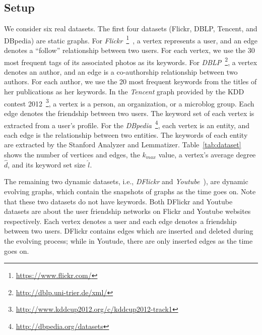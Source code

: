 \subsection{Setup}
\label{setup}

We consider six real datasets. The first four datasets (Flickr, DBLP, Tencent, and DBpedia) are static graphs.
For {\it Flickr}~\footnote{\url{https://www.flickr.com/}}~\cite{thomee2015new}, a vertex represents a user, and an edge denotes a ``follow'' relationship between two users. For each vertex, we use the 30 most frequent tags of its associated photos as its keywords.
For {\it DBLP}~\footnote{\url{http://dblp.uni-trier.de/xml/}}, a vertex denotes an author, and an edge is a co-authorship relationship between two authors.
For each author, we use the 20 most frequent keywords from the titles of her publications as her keywords.
In the {\it Tencent} graph provided by the KDD contest 2012~\footnote{\url{http://www.kddcup2012.org/c/kddcup2012-track1}}, a vertex is a person, an organization, or a microblog group. Each edge denotes the friendship between two users. The keyword set of each vertex is extracted from a user's profile. For the {\it DBpedia}~\footnote{\url{http://dbpedia.org/datasets}}, each vertex is an entity, and each edge is the relationship between two entities. The keywords of each entity are extracted by the Stanford Analyzer and Lemmatizer.
Table~\ref{tab:dataset} shows the number of vertices and edges, the $k_{max}$ value, a vertex's average degree $\widehat d$, and its keyword set size $\widehat l$.

{\color{blue}
The remaining two dynamic datasets,
i.e., {\it DFlickr} and {\it Youtube}~\cite{mislove-2009-socialnetworksthesis,mislove-2008-flickr}),
are dynamic evolving graphs, which contain the snapshots of graphs as the time goes on.
Note that these two datasets do not have keywords.
Both DFlickr and Youtube datasets are about the user friendship networks on Flickr and Youtube websites respectively.
Each vertex denotes a user and each edge denotes a friendship between two users.
DFlickr contains edges which are inserted and deleted during the evolving process;
while in Youtude, there are only inserted edges as the time goes on.
}

